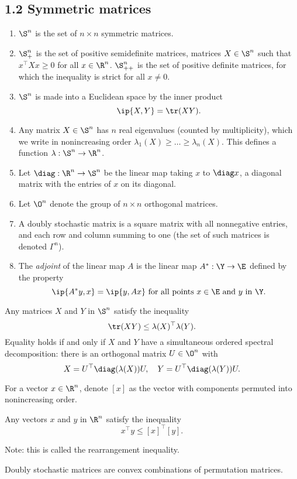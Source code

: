 \documentclass[../borwein-lewis_notes.tex]{subfiles}
\begin{document}
\subsection{1.2 Symmetric matrices}
\begin{enumerate}
\item $\S^n$ is the set of $n\times n$ symmetric matrices. 
\item $\S^n_+$ is the set of positive semidefinite matrices, 
matrices $X\in \S^n$ such that $x^\top Xx\geq 0$ for all $x\in\R^n$. 
$\S^n_{++}$ is the set of positive definite matrices, for which 
the inequality is strict for all $x\neq 0$.
\item $\S^n$ is made into a Euclidean space by the inner product 
\begin{equation*}
\ip{X,Y} = \tr(XY).
\end{equation*}
\item Any matrix $X\in\S^n$ has $n$ real eigenvalues (counted by 
multiplicity), which we write in nonincreasing order $\lambda_1(X) 
\geq \ldots \geq \lambda_n(X)$. This defines a function $\lambda : 
\S^n\to\R^n$.
\item Let $\diag:\R^n\to\S^n$ be the linear map taking $x$ to 
$\diag x$, a diagonal matrix with the entries of $x$ on its diagonal.
\item Let $\O^n$ denote the group of $n\times n$ orthogonal matrices.
\item A doubly stochastic matrix is a square matrix with all nonnegative
entries, and each row and column summing to one (the set of such 
matrices is denoted $\Gamma^n$).
\item The \textit{adjoint} of the linear map $A$ is the linear map 
$A^*:\Y\to\E$ defined by the property 
\begin{equation*}
\ip{A^*y, x} = \ip{y, Ax} \text{ for all points }x\in\E\text{ and }
y\text{ in }\Y.
\end{equation*}
\end{enumerate}
\begin{theorem}[1.2.1, (Fan)]
Any matrices $X$ and $Y$ in $\S^n$ satisfy the inequality 
\begin{equation*}
\tr (XY)\leq \lambda(X)^\top\lambda(Y).
\end{equation*}
Equality holds if and only if $X$ and $Y$ have a simultaneous ordered 
spectral decomposition: there is an orthogonal matrix $U\in\O^n$ with 
\begin{equation*}
X = U^\top \diag(\lambda(X)) U, \quad Y=U^\top \diag(\lambda(Y)) U.
\end{equation*}
\end{theorem}
For a vector $x\in\R^n$, denote $[x]$ as the vector with components 
permuted into nonincreasing order. 
\begin{proposition}
Any vectors $x$ and $y$ in $\R^n$ satisfy the inequality 
\begin{equation*}
x^\top y \leq [x]^\top[y].
\end{equation*}
\end{proposition}
Note: this is called the rearrangement inequality.
\begin{theorem}[1.2.5 (Birkhoff)]
Doubly stochastic matrices are convex combinations of permutation 
matrices.
\end{theorem}
\end{document}
